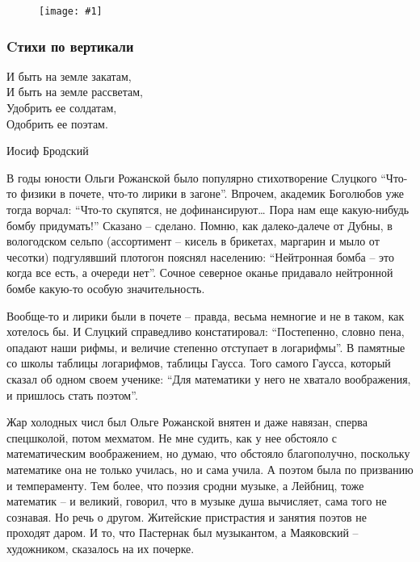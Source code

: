 \documentclass[12pt,a5paper,twoside]{article}
\newcommand{\pict}[1]{\thispagestyle{empty}\begin{figure}[H]\begin{center}\texttt{[image: \#1]}\end{center}\end{figure}\newpage}
\begin{document}
\pict{picts/krest} 
%



\begin{center}
\subsubsection*{Cтихи по вертикали}
\end{center}

\epigraph{
И быть на земле закатам,\\
И быть на земле рассветам,\\
Удобрить ее солдатам,\\
Одобрить ее поэтам.
}{Иосиф Бродский}

В годы юности Ольги Рожанской было популярно стихотворение Слуцкого 
``Что-то физики в почете, что-то лирики в загоне''. Впрочем, академик Боголюбов 
уже тогда ворчал: ``Что-то скупятся, не дофинансируют… Пора нам еще какую-нибудь бомбу придумать!'' 
Сказано -- сделано. Помню, как далеко-далече от Дубны, в вологодском сельпо (ассортимент -- кисель в 
брикетах, маргарин и мыло от чесотки) подгулявший плотогон пояснял населению: 
``Нейтронная бомба -- это когда все есть, а очереди нет''. Сочное северное оканье 
придавало нейтронной бомбе какую-то особую значительность.

Вообще-то и лирики были в почете -- правда, весьма немногие и не в таком, как 
хотелось бы. И Слуцкий справедливо констатировал: ``Постепенно, словно пена, опадают наши рифмы, и 
величие степенно отступает в логарифмы''. В памятные со школы таблицы логарифмов, таблицы Гаусса. 
Того самого Гаусса, который сказал об одном своем ученике: ``Для математики у него не хватало воображения, и пришлось стать поэтом''.
 
Жар холодных числ был Ольге Рожанской внятен и даже навязан, сперва спецшколой, 
потом мехматом. Не мне судить, как у нее обстояло с математическим воображением, но 
думаю, что обстояло благополучно, поскольку математике она не только училась, но и сама 
учила. А поэтом была по призванию и темпераменту. Тем более, что поэзия сродни музыке, а Лейбниц, 
тоже математик -- и великий, говорил, что в музыке душа вычисляет, сама того не сознавая. Но 
речь о другом. Житейские пристрастия и занятия поэтов не проходят даром. И то, что Пастернак 
был музыкантом, а Маяковский -- художником, сказалось на их почерке. 
\end{document}
